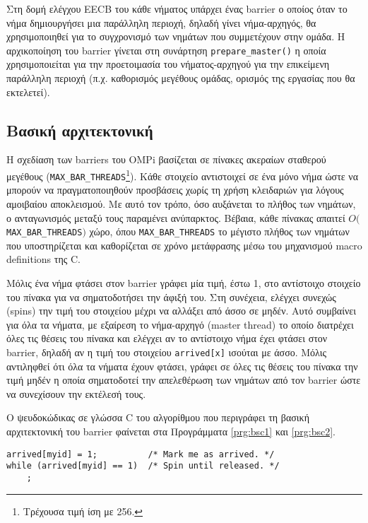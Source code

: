 Στη δομή ελέγχου EECB του κάθε νήματος υπάρχει ένας barrier ο οποίος όταν το νήμα δημιουργήσει μια παράλληλη περιοχή, δηλαδή γίνει νήμα-αρχηγός, θα χρησιμοποιηθεί για το συγχρονισμό των νημάτων που συμμετέχουν στην ομάδα. Η αρχικοποίηση του barrier γίνεται στη συνάρτηση \texttt{prepare\_master()} η οποία χρησιμοποιείται για την προετοιμασία του νήματος-αρχηγού για την επικείμενη παράλληλη περιοχή (π.χ. καθορισμός μεγέθους ομάδας, ορισμός της εργασίας που θα εκτελετεί).


\subsection{Βασική αρχιτεκτονική}
\label{ssec:Basic barrier architecture}
Η σχεδίαση των barriers του OMPi βασίζεται σε πίνακες ακεραίων σταθερού μεγέθους (\texttt{MAX\_BAR\_THREADS}\footnote{Τρέχουσα τιμή ίση με 256.}). Κάθε στοιχείο αντιστοιχεί σε ένα μόνο νήμα ώστε να μπορούν να πραγματοποιηθούν προσβάσεις χωρίς τη χρήση κλειδαριών για λόγους αμοιβαίου αποκλεισμού. Με αυτό τον τρόπο, όσο αυξάνεται το πλήθος των νημάτων, ο ανταγωνισμός μεταξύ τους παραμένει ανύπαρκτος. Βέβαια, κάθε πίνακας απαιτεί $O($\texttt{MAX\_BAR\_THREADS}$)$ χώρο, όπου \texttt{MAX\_BAR\_THREADS} το μέγιστο πλήθος των νημάτων που υποστηρίζεται και καθορίζεται σε χρόνο μετάφρασης μέσω του μηχανισμού macro definitions της C.

Μόλις ένα νήμα φτάσει στον barrier γράφει μία τιμή, έστω 1, στο αντίστοιχο στοιχείο του πίνακα για να σηματοδοτήσει την άφιξή του. Στη συνέχεια, ελέγχει συνεχώς (spins) την τιμή του στοιχείου μέχρι να αλλάξει από άσσο σε μηδέν. Αυτό συμβαίνει για όλα τα νήματα, με εξαίρεση το νήμα-αρχηγό (master thread) το οποίο διατρέχει όλες τις θέσεις του πίνακα και ελέγχει αν το αντίστοιχο νήμα έχει φτάσει στον barrier, δηλαδή αν η τιμή του στοιχείου \texttt{arrived[x]} ισούται με άσσο. Μόλις αντιληφθεί ότι όλα τα νήματα έχουν φτάσει, γράφει σε όλες τις θέσεις του πίνακα την τιμή μηδέν η οποία σηματοδοτεί την απελεθέρωση των νημάτων από τον barrier ώστε να συνεχίσουν την εκτέλεσή τους.

Ο ψευδοκώδικας σε γλώσσα C του αλγορίθμου που περιγράφει τη βασική αρχιτεκτονική του barrier φαίνεται στα Προγράμματα \ref{prg:bsc1} και \ref{prg:bsc2}.

\begin{lstlisting}[label=prg:bsc1, caption=Απλός barrier για όλα τα νήματα πλην του νήματος-αρχηγού.]
arrived[myid] = 1;          /* Mark me as arrived. */
while (arrived[myid] == 1)  /* Spin until released. */
    ;
\end{lstlisting}

